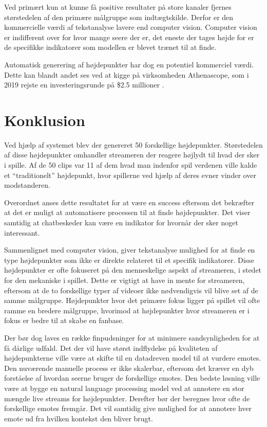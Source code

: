 \documentclass{article}
\begin{document}
Ved primært kun at kunne få positive resultater på store kanaler fjernes størstedelen af den primære målgruppe som indtægtskilde. Derfor er den kommercielle værdi af tekstanalyse lavere end computer vision. Computer vision er indifferent over for hvor mange seere der er, det eneste der tages højde for er de specifikke indikatorer som modellen er blevet trænet til at finde.

Automatisk generering af højdepunkter har dog en potentiel kommerciel værdi. Dette kan blandt andet ses ved at kigge på virksomheden Athenascope, som i 2019 rejste en investeringsrunde på \$2.5 millioner \cite{crunchbase_athenascope_nodate}.

\section{Konklusion}
Ved hjælp af systemet blev der genereret 50 forskellige højdepunkter. Størstedelen af disse højdepunkter omhandler streameren der reagere højlydt til hvad der sker i spille.
Af de 50 clips var 11 af dem hvad man indenfor spil verdenen ville kalde et “traditionelt” højdepunkt, hvor spillerne ved hjælp af deres evner vinder over modstanderen.

Overordnet anses dette resultatet for at være en success eftersom det bekræfter at det er muligt at automatisere processen til at finde højdepunkter. Det viser samtidig at chatbeskeder kan være en indikator for hvornår der sker noget interessant.

Sammenlignet med computer vision, giver tekstanalyse mulighed for at finde en type højdepunkter som ikke er direkte relateret til et specifik indikatorer. Disse højdepunkter er ofte fokuseret på den menneskelige aspekt af streameren, i stedet for den mekaniske i spillet. Dette er vigtigt at have in mente for streameren, eftersom at de to forskellige typer af videoer ikke nødvendigvis vil blive set af de samme målgruppe. Højdepunkter hvor det primære fokus ligger på spillet vil ofte ramme en bredere målgruppe, hvorimod at højdepunkter hvor streameren er i fokus er bedre til at skabe en fanbase.

Der bør dog laves en række finpudsninger for at minimere sandsynligheden for at få dårlige udfald. Det der vil have størst indflydelse på kvaliteten af højdepunkterne ville være at skifte til en datadreven model til at vurdere emotes. Den nuværende manuelle process er ikke skalerbar, eftersom det kræver en dyb forståelse af hvordan seerne bruger de forskellige emotes. Den bedste løsning ville være at bygge en natural language processing model ved at annotere en stor mængde live streams for højdepunkter. Derefter bør der beregnes hvor ofte de forskellige emotes fremgår. Det vil samtidig give mulighed for at annotere hver emote ud fra hvilken kontekst den bliver brugt.
\end{document}
